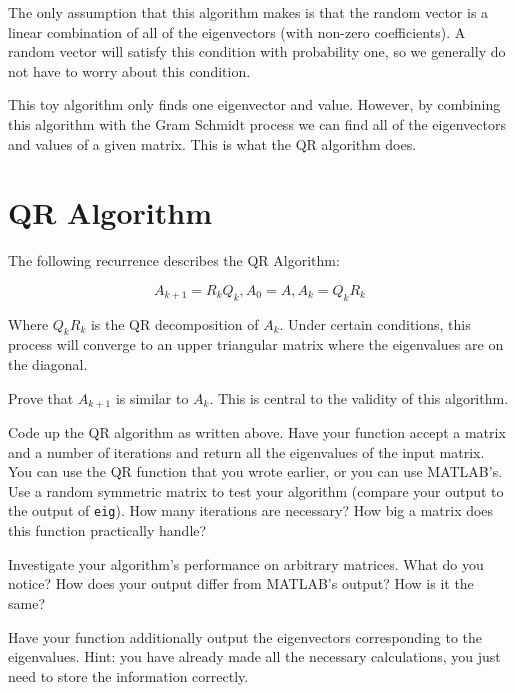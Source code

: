 The only assumption that this algorithm makes is that the random vector is a linear combination of all of the eigenvectors (with non-zero coefficients). A random vector will satisfy this condition with probability one, so we generally do not have to worry about this condition. 

This toy algorithm only finds one eigenvector and value. However, by combining this algorithm with the Gram Schmidt process we can find all of the eigenvectors and values of a given matrix. This is what the QR algorithm does.

\section*{QR Algorithm}

The following recurrence describes the QR Algorithm:

\[
A_{k+1} = R_k Q_k, A_0 = A, A_k = Q_k R_k
\]

Where $Q_kR_k$ is the QR decomposition of $A_k$. Under certain conditions, this process will converge to an upper triangular matrix where the eigenvalues are on the diagonal.

\begin{problem}
Prove that $A_{k+1}$ is similar to $A_k$. This is central to the validity of this algorithm.
\end{problem}

\begin{problem}
Code up the QR algorithm as written above. Have your function accept a matrix and a number of iterations and return all the eigenvalues of the input matrix. You can use the QR function that you wrote earlier, or you can use MATLAB's. Use a random symmetric matrix to test your algorithm (compare your output to the output of {\tt eig}). How many iterations are necessary? How big a matrix does this function practically handle?
\end{problem}

\begin{problem}
Investigate your algorithm's performance on arbitrary matrices. What do you notice? How does your output differ from MATLAB's output? How is it the same?
\end{problem}

\begin{problem}
Have your function additionally output the eigenvectors corresponding to the eigenvalues. Hint: you have already made all the necessary calculations, you just need to store the information correctly.
\end{problem}

